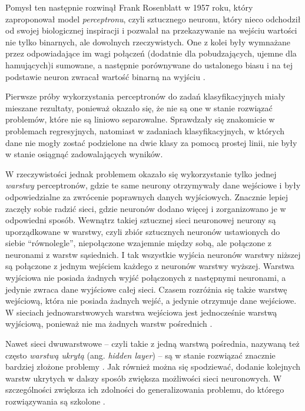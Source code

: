 Pomysł ten następnie rozwinął Frank Rosenblatt w 1957 roku, który zaproponował model \emph{perceptronu}, czyli sztucznego neuronu, który nieco odchodził od swojej biologicznej inspiracji i pozwalał na przekazywanie na wejściu wartości nie tylko binarnych, ale dowolnych rzeczywistych.
One z kolei były wymnażane przez odpowiadające im wagi połączeń (dodatnie dla pobudzających, ujemne dla hamujących)i sumowane, a następnie porównywane do ustalonego biasu i na tej podstawie neuron zwracał wartość binarną na wyjściu \cite{rosenbaltt1957perceptron}.

Pierwsze próby wykorzystania perceptronów do zadań klasyfikacyjnych miały mieszane rezultaty, ponieważ okazało się, że nie są one w stanie rozwiązać problemów, które nie są liniowo separowalne.
Sprawdzały się znakomicie w problemach regresyjnych, natomiast w zadaniach klasyfikacyjnych, w których dane nie mogły zostać podzielone na dwie klasy za pomocą prostej linii, nie były w stanie osiągnąć zadowalających wyników.

W rzeczywistości jednak problemem okazało się wykorzystanie tylko jednej \emph{warstwy} perceptronów, gdzie te same neurony otrzymywały dane wejściowe i były odpowiedzialne za zwrócenie poprawnych danych wyjściowych.
Znacznie lepiej zaczęły sobie radzić sieci, gdzie neuronów dodano więcej i zorganizowano je w odpowiedni sposób.
Wewnątrz takiej sztucznej sieci neuronowej neurony są uporządkowane w warstwy, czyli zbiór sztucznych neuronów ustawionych do siebie ``równolegle'', niepołączone wzajemnie między sobą, ale połączone z neuronami z warstw sąsiednich.
I tak wszystkie wyjścia neuronów warstwy niższej są połączone z jednym wejściem każdego z neuronów warstwy wyższej.
Warstwa wyjściowa nie posiada żadnych wyjść połączonych z następnymi neuronami, a jedynie zwraca dane wyjściowe całej sieci.
Czasem rozróżnia się także warstwę wejściową, która nie posiada żadnych wejść, a jedynie otrzymuje dane wejściowe.
W sieciach jednowarstwowych warstwa wejściowa jest jednocześnie warstwą wyjściową, ponieważ nie ma żadnych warstw pośrednich \cite{bishop1994neural}.

Nawet sieci dwuwarstwowe -- czyli takie z jedną warstwą pośrednia, nazywaną też często \emph{warstwą ukrytą} (ang. \emph{hidden layer}) -- są w stanie rozwiązać znacznie bardziej złożone problemy \cite{huang2000classification}.
Jak również można się spodziewać, dodanie kolejnych warstw ukrytych w dalszy sposób zwiększa możliwości sieci neuronowych.
W szczególności zwiększa ich zdolności do generalizowania problemu, do którego rozwiązywania są szkolone \cite{thomas2017two}.

